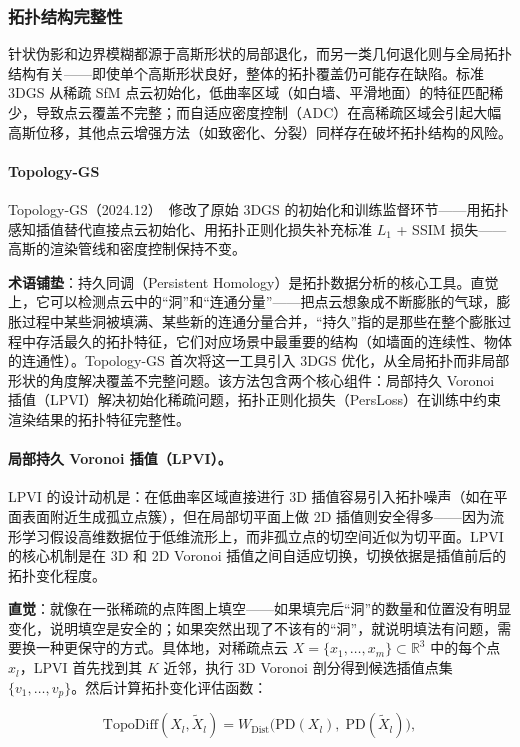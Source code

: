 \subsubsection{拓扑结构完整性}

针状伪影和边界模糊都源于高斯形状的局部退化，而另一类几何退化则与全局拓扑结构有关——即使单个高斯形状良好，整体的拓扑覆盖仍可能存在缺陷。标准 3DGS 从稀疏 SfM 点云初始化，低曲率区域（如白墙、平滑地面）的特征匹配稀少，导致点云覆盖不完整；而自适应密度控制（ADC）在高稀疏区域会引起大幅高斯位移，其他点云增强方法（如致密化、分裂）同样存在破坏拓扑结构的风险。

\paragraph{Topology-GS}
Topology-GS（2024.12）~\cite{2412_16619}修改了原始 3DGS 的初始化和训练监督环节——用拓扑感知插值替代直接点云初始化、用拓扑正则化损失补充标准 $L_1$ + SSIM 损失——高斯的渲染管线和密度控制保持不变。

\textbf{术语铺垫}：持久同调（Persistent Homology）是拓扑数据分析的核心工具。直觉上，它可以检测点云中的``洞''和``连通分量''——把点云想象成不断膨胀的气球，膨胀过程中某些洞被填满、某些新的连通分量合并，``持久''指的是那些在整个膨胀过程中存活最久的拓扑特征，它们对应场景中最重要的结构（如墙面的连续性、物体的连通性）。Topology-GS 首次将这一工具引入 3DGS 优化，从全局拓扑而非局部形状的角度解决覆盖不完整问题。该方法包含两个核心组件：局部持久 Voronoi 插值（LPVI）解决初始化稀疏问题，拓扑正则化损失（PersLoss）在训练中约束渲染结果的拓扑特征完整性。

\paragraph{局部持久 Voronoi 插值（LPVI）。}LPVI 的设计动机是：在低曲率区域直接进行 3D 插值容易引入拓扑噪声（如在平面表面附近生成孤立点簇），但在局部切平面上做 2D 插值则安全得多——因为流形学习假设高维数据位于低维流形上，而非孤立点的切空间近似为切平面。LPVI 的核心机制是在 3D 和 2D Voronoi 插值之间自适应切换，切换依据是插值前后的拓扑变化程度。

\textbf{直觉}：就像在一张稀疏的点阵图上填空——如果填完后``洞''的数量和位置没有明显变化，说明填空是安全的；如果突然出现了不该有的``洞''，就说明填法有问题，需要换一种更保守的方式。具体地，对稀疏点云 $X = \{x_1, \ldots, x_m\} \subset \mathbb{R}^3$ 中的每个点 $x_l$，LPVI 首先找到其 $K$ 近邻，执行 3D Voronoi 剖分得到候选插值点集 $\{v_1, \ldots, v_p\}$。然后计算拓扑变化评估函数：

\begin{equation}
\mathrm{TopoDiff}(X_l, \tilde{X}_l) = W_{\mathrm{Dist}}\!\bigl(\mathrm{PD}(X_l),\;\mathrm{PD}(\tilde{X}_l)\bigr),
\label{eq:02_topodiff}
\end{equation}

